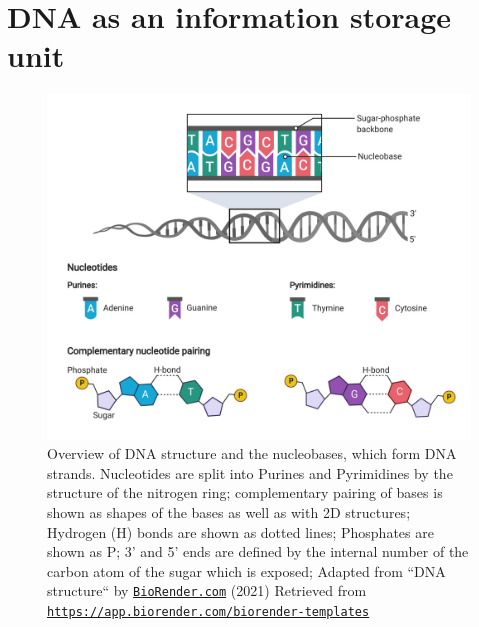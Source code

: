 \section[DNA]{DNA as an information storage unit} 
\label{intro-sec:DNA}

\begin{figure}[!ht]
\centering
\includegraphics[width=0.9\linewidth]{Figures/intro/DNAStructure}
\caption[Overview DNA structure]{Overview of DNA structure and the nucleobases, which form DNA strands. Nucleotides are split into Purines and Pyrimidines by the structure of the nitrogen ring; complementary pairing of bases is shown as shapes of the bases as well as with 2D structures; Hydrogen (H) bonds are shown as dotted lines; Phosphates are shown as P; 3' and 5' ends are defined by the internal number of the carbon atom of the sugar which is exposed; Adapted from ``DNA structure`` by \href{https://biorender.com}{\nolinkurl{BioRender.com}} (2021) Retrieved from \href{https://app.biorender.com/biorender-templates}{\nolinkurl{https://app.biorender.com/biorender-templates}}}\label{fig:DNAstructure}
\end{figure}


